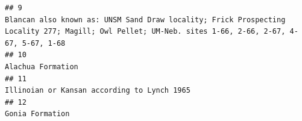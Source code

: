 \documentclass[]{article}
\begin{document}
\begin{verbatim}
## 9                                                                                                                                                                                                                                                                                                                                                                                                                                                                                                                                              Blancan also known as: UNSM Sand Draw locality; Frick Prospecting Locality 277; Magill; Owl Pellet; UM-Neb. sites 1-66, 2-66, 2-67, 4-67, 5-67, 1-68
## 10                                                                                                                                                                                                                                                                                                                                                                                                                                                                                                                                                                                                                                                                                Alachua Formation
## 11                                                                                                                                                                                                                                                                                                                                                                                                                                                                                                                                                                                                                                                      Illinoian or Kansan according to Lynch 1965
## 12                                                                                                                                                                                                                                                                                                                                                                                                                                                                                                                                                                                                                                                                                  Gonia Formation

\end{verbatim}
\end{document}
